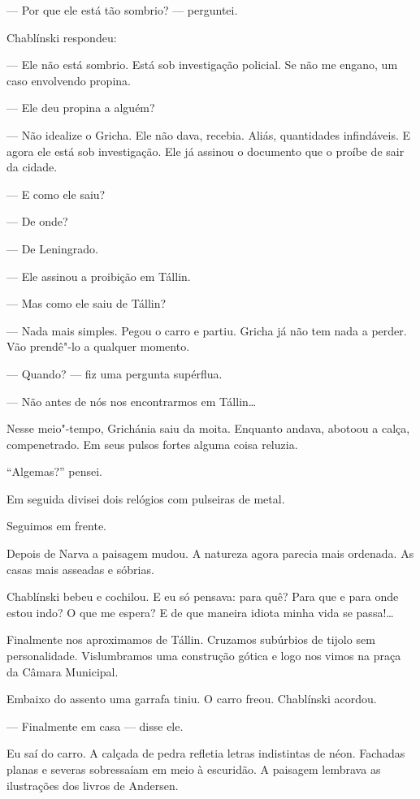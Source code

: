--- Por que ele está tão sombrio? --- perguntei.

Chablínski respondeu:

--- Ele não está sombrio. Está sob investigação policial. Se não me engano,
um caso envolvendo propina.

--- Ele deu propina a alguém?

--- Não idealize o Gricha. Ele não dava, recebia. Aliás, quantidades
infindáveis. E agora ele está sob investigação. Ele já assinou o documento
que o proíbe de sair da cidade.

--- E como ele saiu?

--- De onde?

--- De Leningrado.

--- Ele assinou a proibição em Tállin.

--- Mas como ele saiu de Tállin?

--- Nada mais simples. Pegou o carro e partiu. Gricha já não tem nada a
perder. Vão prendê"-lo a qualquer momento.

--- Quando? --- fiz uma pergunta supérflua.

--- Não antes de nós nos encontrarmos em Tállin\ldots{}

Nesse meio"-tempo, Grichánia saiu da moita. Enquanto andava, abotoou a
calça, compenetrado. Em seus pulsos fortes alguma coisa reluzia.

``Algemas?'' pensei.

Em seguida divisei dois relógios com pulseiras de metal.

Seguimos em frente.

Depois de Narva a paisagem mudou. A natureza agora parecia mais
ordenada. As casas mais asseadas e sóbrias.

Chablínski bebeu e cochilou. E eu só pensava: para quê? Para que e para
onde estou indo? O que me espera? E de que maneira idiota minha vida se
passa!\ldots{}

Finalmente nos aproximamos de Tállin. Cruzamos subúrbios de tijolo sem
personalidade. Vislumbramos uma construção gótica e logo nos vimos na
praça da Câmara Municipal.

Embaixo do assento uma garrafa tiniu. O carro freou. Chablínski acordou.

--- Finalmente em casa --- disse ele.

Eu saí do carro. A calçada de pedra refletia letras indistintas de néon. Fachadas
planas e severas sobressaíam em meio à escuridão. A paisagem lembrava as
ilustrações dos livros de Andersen.

